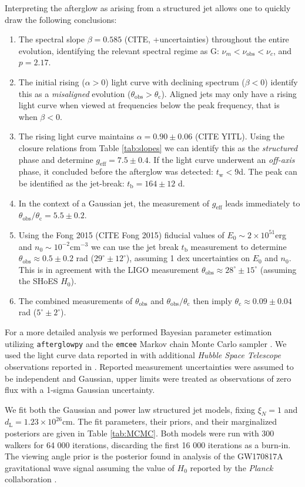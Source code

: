 \documentclass[twocolumn]{aastex62}
\newcommand{\gwbns}{GW170817A}
\newcommand{\afterglowpy}{{\tt afterglowpy}}
\newcommand{\emcee}{{\tt emcee}}
\newcommand{\hubble}{{\em Hubble Space Telescope}}
\newcommand{\planck}{{\em Planck}}
\newcommand{\tW}{\ensuremath{t_{\mathrm{w}}}}
\newcommand{\tb}{\ensuremath{t_{\mathrm{b}}}}
\newcommand{\nuobs}{\ensuremath{\nu_{\mathrm{obs}}}}
\newcommand{\thobs}{\ensuremath{\theta_{\mathrm{obs}}}}
\newcommand{\thC}{\ensuremath{\theta_{\mathrm{c}}}}
\newcommand{\dL}{\ensuremath{d_{\mathrm{L}}}}
\newcommand{\geff}{\ensuremath{g_{\mathrm{eff}}}}
\begin{document}
Interpreting the afterglow as arising from a structured jet allows one to quickly draw the following conclusions:
\begin{enumerate}
	\item The spectral slope $\beta = 0.585$ (CITE, +uncertainties) throughout the entire evolution, identifying the relevant spectral regime as G: $\nu_m < \nuobs < \nu_c$, and $p = 2.17$.
	\item The initial rising ($\alpha > 0$) light curve with declining spectrum ($\beta < 0$) identify this as a \emph{misaligned} evolution ($\thobs > \thC$).  Aligned jets may only have a rising light curve when viewed at frequencies below the peak frequency, that is when $\beta < 0$.
	\item The rising light curve maintains $\alpha  = 0.90 \pm 0.06$ (CITE YITL).  Using the closure relations from Table \ref{tab:slopes} we can identify this as the \emph{structured} phase and determine $\geff = 7.5 \pm 0.4$.  If the light curve underwent an \emph{off-axis} phase, it concluded before the afterglow was detected: $\tW < 9$d.  The peak can be identified as the jet-break: $\tb = 164 \pm 12$ d.
	\item In the context of a Gaussian jet, the measurement of $\geff$ leads immediately to $\thobs / \thC = 5.5 \pm 0.2$.
	\item Using the Fong 2015 (CITE Fong 2015) fiducial values of $E_0 \sim 2\times 10^{51}$erg and $n_0 \sim 10^{-2}$cm$^{-3}$ we can use the jet break $\tb$ measurement to determine $\thobs \approx 0.5 \pm 0.2$ rad ($29^\circ \pm 12^\circ$), assuming 1 dex uncertainties on $E_0$ and $n_0$.    This is in agreement with the LIGO measurement $\thobs \approx 28^\circ \pm 15^\circ$ (assuming the SHoES $H_0$).
	\item The combined measurements of $\thobs$ and $\thobs/\thC$ then imply $\thC \approx 0.09 \pm 0.04$ rad ($5^\circ  \pm 2^\circ$).
\end{enumerate}

For a more detailed analysis we performed Bayesian parameter estimation utilizing \afterglowpy{} and the \emcee{} Markov chain Monte Carlo sampler \citep{Foreman-Mackey:2013aa}.  We used the light curve data reported in \citet{van-Eerten:2018aa} with additional \hubble{} observations reported in \citet{Lamb:2019aa}. Reported measurement uncertainties were assumed to be independent and Gaussian, upper limits were treated as observations of zero flux with a 1-sigma Gaussian uncertainty. 

We fit both the Gaussian and power law structured jet models, fixing $\xi_N = 1$ and $\dL = 1.23 \times 10^{26}$cm.  The fit parameters, their priors, and their marginalized posteriors are given in Table \ref{tab:MCMC}. Both models were run with 300 walkers for 64 000 iterations, discarding the first 16 000 iterations as a burn-in.  The viewing angle prior is the posterior found in analysis of the \gwbns{} gravitational wave signal assuming the value of $H_0$ reported by the \planck{} collaboration \citep{Abbott:2017aa, Planck-Collaboration:2016aa, Troja:2018aa}.  
\end{document}
